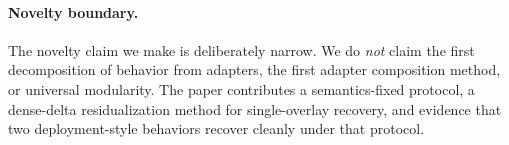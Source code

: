 \paragraph{Novelty boundary.}
The novelty claim we make is deliberately narrow. We do \emph{not} claim the first decomposition of behavior from adapters, the first adapter composition method, or universal modularity. The paper contributes a semantics-fixed protocol, a dense-delta residualization method for single-overlay recovery, and evidence that two deployment-style behaviors recover cleanly under that protocol.
